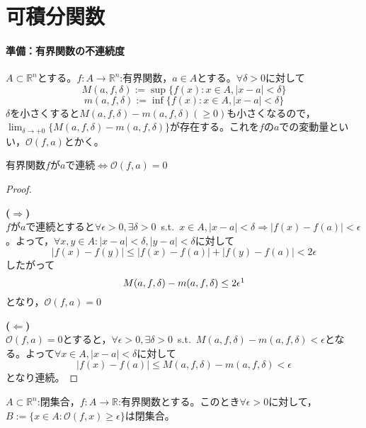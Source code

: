 \section{可積分関数}
\paragraph{準備：有界関数の不連続度}
\begin{dfn*}[変動量]
$A\subset \mathbb{R}^n$とする。$f:A\to\mathbb{R}^n$:有界関数，$a\in A$とする。$\forall\delta>0$に対して
\[
	M(a,f,\delta):=\sup\{f(x):x\in A,|x-a|<\delta\}
\]
\[
	m(a,f,\delta):=\inf\{f(x):x\in A,|x-a|<\delta\}
\]
$\delta$を小さくすると$M(a,f,\delta)-m(a,f,\delta)(\geq 0)$も小さくなるので，$\displaystyle\lim_{\delta\to+0}\{M(a,f,\delta)-m(a,f,\delta)\}$が存在する。これを$f$の$a$での変動量といい，$\mathscr{O}(f,a)$とかく。
\end{dfn*}
\begin{thm*}
有界関数$f$が$a$で連続$\Leftrightarrow$$\mathscr{O}(f,a)=0$
\end{thm*}
\begin{proof}\
	\par\noindent\textbf{($\Rightarrow$)}\\
	$f$が$a$で連続とすると$\forall\epsilon>0,\exists\delta>0$\ s.t.\ $x\in A,|x-a|<\delta\Rightarrow|f(x)-f(a)|<\epsilon$。よって，$\forall x,y\in A:|x-a|<\delta,|y-a|<\delta$に対して
	\[
	|f(x)-f(y)|\leq |f(x)-f(a)|+|f(y)-f(a)|< 2\epsilon
	\]
	したがって
	\[
	M(a,f,\delta)-m(a,f,\delta)\leq 2\epsilon \footnotemark
	\]
	となり，$\mathscr{O}(f,a)=0$\\
	\par\noindent\textbf{($\Leftarrow$)}\\
	$\mathscr{O}(f,a)=0$とすると，$\forall\epsilon>0,\exists\delta>0$\ s.t.\ $M(a,f,\delta)-m(a,f,\delta)<\epsilon$となる。よって$\forall x\in A,|x-a|<\delta$に対して
	\[
		|f(x)-f(a)|\leq M(a,f,\delta)-m(a,f,\delta)<\epsilon
	\]
	となり連続。
\end{proof}
\begin{framed}
	\begin{thm}\label{th3.7}
		$A\subset\mathbb{R}^n$:閉集合，$f:A\to\mathbb{R}$:有界関数とする。このとき$\forall\epsilon>0$に対して，$B:=\{x\in A:\mathscr{O}(f,x)\geq \epsilon\}$は閉集合。
	\end{thm}
\end{framed}


